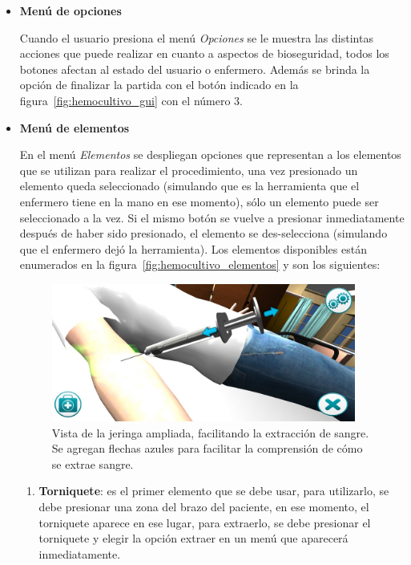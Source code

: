 \begin{itemize}
\item \textbf{Menú de opciones}

Cuando el usuario presiona el menú \emph{Opciones} se le muestra las distintas acciones que puede
realizar en cuanto a aspectos de bioseguridad, todos los botones
afectan al estado del usuario o enfermero. %
Además se brinda la opción de finalizar la partida con el botón
indicado en la figura~\ref{fig:hemocultivo_gui} con el número $3$.

\item \textbf{Menú de elementos}

En el menú \emph{Elementos} se despliegan opciones que representan a los
elementos que se utilizan para realizar el procedimiento, una vez presionado un
elemento queda seleccionado (simulando que es la herramienta que el enfermero
tiene en la mano en ese momento), sólo un elemento puede ser seleccionado a la
vez. Si el mismo botón se vuelve a presionar inmediatamente después de haber
sido presionado, el elemento se des-selecciona (simulando que el enfermero dejó
la herramienta). Los elementos disponibles están enumerados en la 
figura~\ref{fig:hemocultivo_elementos} y son los siguientes:


\begin{figure}[H]
\centering 
\includegraphics[width=10cm]{solucion/images/hemocultivo_jeringa_ampliada.jpg}
\caption{Vista de la jeringa ampliada, facilitando la extracción de sangre. Se
    agregan flechas azules para facilitar la comprensión de cómo se extrae
    sangre.}
\label{fig:hemocultivo_jeringa_zoom}
\end{figure}

\begin{enumerate}
\item \textbf{Torniquete}: es el primer elemento que se debe usar, para
    utilizarlo, se debe presionar una zona del brazo del
    paciente, en ese momento, el torniquete aparece en ese lugar, para
    extraerlo, se debe presionar el torniquete y elegir la opción extraer en un menú 
    que aparecerá inmediatamente.


\end{enumerate}
\end{itemize}
